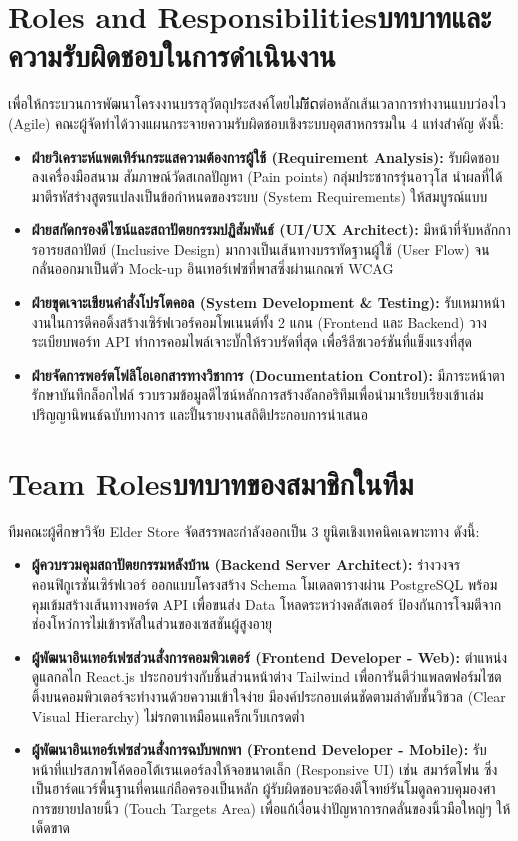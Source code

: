 \section{\ifenglish Roles and Responsibilities\else บทบาทและความรับผิดชอบในการดำเนินงาน\fi}
เพื่อให้กระบวนการพัฒนาโครงงานบรรลุวัตถุประสงค์โดยไม่ขັດต่อหลักเส้นเวลาการทำงานแบบว่องไว (Agile) \cite{beck2001} คณะผู้จัดทำได้วางแผนกระจายความรับผิดชอบเชิงระบบอุตสาหกรรมใน 4 แท่งสำคัญ ดังนี้:
\begin{itemize}
    \item \textbf{ฝ่ายวิเคราะห์แพตเทิร์นกระแสความต้องการผู้ใช้ (Requirement Analysis):} รับผิดชอบลงเครื่องมือสนาม สัมภาษณ์วัดสเกลปัญหา (Pain points) กลุ่มประชากรรุ่นอาวุโส นำผลที่ได้มาตีรหัสร่างสูตรแปลงเป็นข้อกำหนดของระบบ (System Requirements) ให้สมบูรณ์แบบ \cite{pressman2014}
    \item \textbf{ฝ่ายสกัดกรองดีไซน์และสถาปัตยกรรมปฏิสัมพันธ์ (UI/UX Architect):} มีหน้าที่จับหลักการอารยสถาปัตย์ (Inclusive Design) มากางเป็นเส้นทางบรรทัดฐานผู้ใช้ (User Flow) จนกลั่นออกมาเป็นตัว Mock-up อินเทอร์เฟซที่พาสซิ่งผ่านเกณฑ์ WCAG
    \item \textbf{ฝ่ายขุดเจาะเขียนคำสั่งโปรโตคอล (System Development \& Testing):} รับเหมาหน้างานในการดีคอดิ้งสร้างเซิร์ฟเวอร์คอมโพเนนต์ทั้ง 2 แกน (Frontend และ Backend) วางระเบียบพอร์ท API ทำการคอมไพล์เจาะบั๊กให้รวบรัดที่สุด เพื่อรีลีซเวอร์ชันที่แข็งแรงที่สุด
    \item \textbf{ฝ่ายจัดการพอร์ตโฟลิโอเอกสารทางวิชาการ (Documentation Control):} มีภาระหน้าตารักษาบันทึกล็อกไฟล์ รวบรวมข้อมูลดีไซน์หลักการสร้างอัลกอริทึมเพื่อนำมาเรียบเรียงเข้าเล่มปริญญานิพนธ์ฉบับทางการ และปั้นรายงานสถิติประกอบการนำเสนอ
\end{itemize}

\section{\ifenglish Team Roles\else บทบาทของสมาชิกในทีม\fi}
ทีมคณะผู้ศึกษาวิจัย Elder Store จัดสรรพละกำลังออกเป็น 3 ยูนิตเชิงเทคนิคเฉพาะทาง ดังนี้:
\begin{itemize}
    \item \textbf{ผู้ควบรวมคุมสถาปัตยกรรมหลังบ้าน (Backend Server Architect):} ร่างวงจรคอนฟิกูเรชันเซิร์ฟเวอร์ ออกแบบโครงสร้าง Schema โมเดลตารางผ่าน PostgreSQL พร้อมคุมเข้มสร้างเส้นทางพอร์ต API เพื่อขนส่ง Data โหลดระหว่างคลัสเตอร์ ป้องกันการโจมตีจากช่องโหว่การไม่เข้ารหัสในส่วนของเซสชันผู้สูงอายุ
    \item \textbf{ผู้พัฒนาอินเทอร์เฟซส่วนสั่งการคอมพิวเตอร์ (Frontend Developer - Web):} ตำแหน่งดูแลกลไก React.js ประกอบร่างกับชิ้นส่วนหน้าต่าง Tailwind เพื่อการันตีว่าแพลตฟอร์มไซตติ้งบนคอมพิวเตอร์จะทำงานด้วยความเข้าใจง่าย มีองค์ประกอบเด่นชัดตามลำดับชั้นวิชวล (Clear Visual Hierarchy) ไม่รกตาเหมือนแคร็กเว็บเกรดต่ำ
    \item \textbf{ผู้พัฒนาอินเทอร์เฟซส่วนสั่งการฉบับพกพา (Frontend Developer - Mobile):} รับหน้าที่แปรสภาพโค้ดออโต้เรนเดอร์ลงให้จอขนาดเล็ก (Responsive UI) เช่น สมาร์ตโฟน ซึ่งเป็นฮาร์ดแวร์พื้นฐานที่คนแก่ถือครองเป็นหลัก ผู้รับผิดชอบจะต้องตีโจทย์รันโมดูลควบคุมองศาการขยายปลายนิ้ว (Touch Targets Area) เพื่อแก้เงื่อนงำปัญหาการกดลั่นของนิ้วมือใหญ่ๆ ให้เด็ดขาด
\end{itemize}


